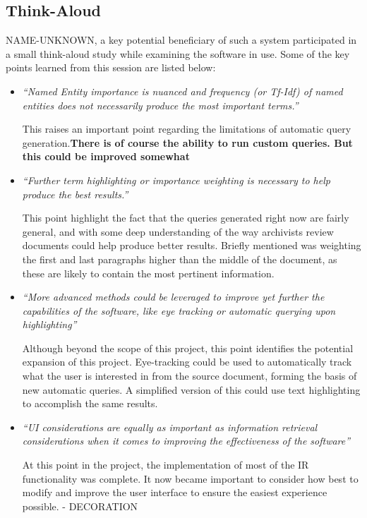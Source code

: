 \documentclass{l4proj}
\begin{document}
\subsection{Think-Aloud}

NAME-UNKNOWN, a key potential beneficiary of such a system participated in a small think-aloud study while examining the software in use. Some of the key points learned from this session are listed below:

\begin{itemize}
\item \textit{``Named Entity importance is nuanced and frequency (or Tf-Idf) of named entities does not necessarily produce the most important terms.''}
\par
This raises an important point regarding the limitations of automatic query generation.\textbf{There is of course the ability to run custom queries. But this could be improved somewhat}

\item \textit{``Further term highlighting or importance weighting is necessary to help produce the best results.''}
\par
This point highlight the fact that the queries generated right now are fairly general, and with some deep understanding of the way archivists review documents could help produce better results. Briefly mentioned was weighting the first and last paragraphs higher than the middle of the document, as these are likely to contain the most pertinent information.

\item \textit{``More advanced methods could be leveraged to improve yet further the capabilities of the software, like eye tracking or automatic querying upon highlighting''}
\par
Although beyond the scope of this project, this point identifies the potential expansion of this project. Eye-tracking could be used to automatically track what the user is interested in from the source document, forming the basis of new automatic queries. A simplified version of this could use text highlighting to accomplish the same results.

\item \textit{``UI considerations are equally as important as information retrieval considerations when it comes to improving the effectiveness of the software''}
\par
At this point in the project, the implementation of most of the IR functionality was complete. It now became important to consider how best to modify and improve the user interface to ensure the easiest experience possible. - DECORATION
\end{itemize}
\end{document}
